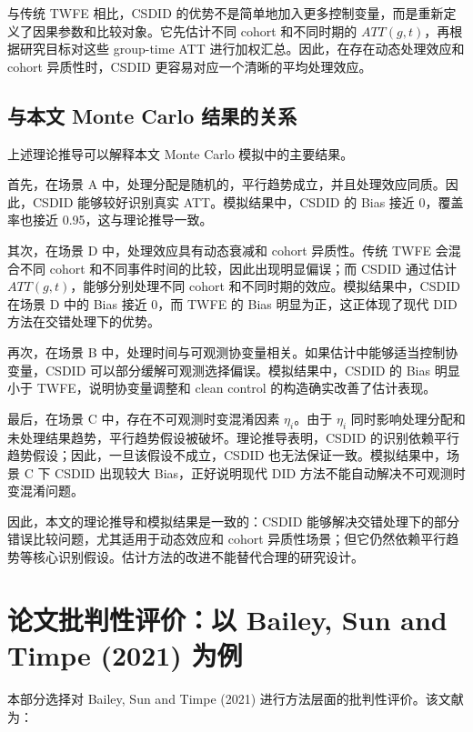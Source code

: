 \documentclass[
  fontset=windows]{ctexart}
\begin{document}
与传统 TWFE 相比，CSDID
的优势不是简单地加入更多控制变量，而是重新定义了因果参数和比较对象。它先估计不同
cohort 和不同时期的 \(ATT(g,t)\)，再根据研究目标对这些 group-time ATT
进行加权汇总。因此，在存在动态处理效应和 cohort 异质性时，CSDID
更容易对应一个清晰的平均处理效应。

\subsection{与本文 Monte Carlo
结果的关系}\label{ux4e0eux672cux6587-monte-carlo-ux7ed3ux679cux7684ux5173ux7cfb}

上述理论推导可以解释本文 Monte Carlo 模拟中的主要结果。

首先，在场景 A
中，处理分配是随机的，平行趋势成立，并且处理效应同质。因此，CSDID
能够较好识别真实 ATT。模拟结果中，CSDID 的 Bias 接近 0，覆盖率也接近
0.95，这与理论推导一致。

其次，在场景 D 中，处理效应具有动态衰减和 cohort 异质性。传统 TWFE
会混合不同 cohort 和不同事件时间的比较，因此出现明显偏误；而 CSDID
通过估计 \(ATT(g,t)\)，能够分别处理不同 cohort
和不同时期的效应。模拟结果中，CSDID 在场景 D 中的 Bias 接近 0，而 TWFE
的 Bias 明显为正，这正体现了现代 DID 方法在交错处理下的优势。

再次，在场景 B
中，处理时间与可观测协变量相关。如果估计中能够适当控制协变量，CSDID
可以部分缓解可观测选择偏误。模拟结果中，CSDID 的 Bias 明显小于
TWFE，说明协变量调整和 clean control 的构造确实改善了估计表现。

最后，在场景 C 中，存在不可观测时变混淆因素 \(\eta_i\)。由于 \(\eta_i\)
同时影响处理分配和未处理结果趋势，平行趋势假设被破坏。理论推导表明，CSDID
的识别依赖平行趋势假设；因此，一旦该假设不成立，CSDID
也无法保证一致。模拟结果中，场景 C 下 CSDID 出现较大 Bias，正好说明现代
DID 方法不能自动解决不可观测时变混淆问题。

因此，本文的理论推导和模拟结果是一致的：CSDID
能够解决交错处理下的部分错误比较问题，尤其适用于动态效应和 cohort
异质性场景；但它仍然依赖平行趋势等核心识别假设。估计方法的改进不能替代合理的研究设计。

\section{论文批判性评价：以 Bailey, Sun and Timpe (2021)
为例}\label{ux8bbaux6587ux6279ux5224ux6027ux8bc4ux4ef7ux4ee5-bailey-sun-and-timpe-2021-ux4e3aux4f8b}

本部分选择对 Bailey, Sun and Timpe (2021)
进行方法层面的批判性评价。该文献为：
\end{document}
